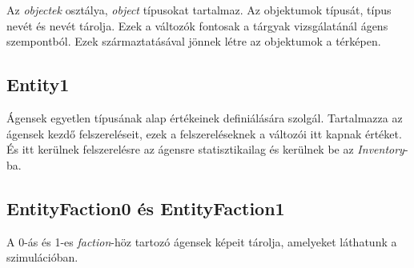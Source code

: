 Az \textit{objectek} osztálya, \textit{object} típusokat tartalmaz.
Az objektumok típusát, típus nevét és nevét tárolja. Ezek a változók fontosak a tárgyak vizsgálatánál ágens szempontból.
Ezek származtatásával jönnek létre az objektumok a térképen.

\subsection{Entity1}

Ágensek egyetlen típusának alap értékeinek definiálására szolgál.
Tartalmazza az ágensek kezdő felszereléseit, ezek a felszereléseknek a változói itt kapnak értéket.
És itt kerülnek felszerelésre az ágensre statisztikailag és kerülnek be az \textit{Inventory}-ba.

\subsection{EntityFaction0 és EntityFaction1}

A 0-ás és 1-es \textit{faction}-höz tartozó ágensek képeit tárolja, amelyeket láthatunk a szimulációban.
